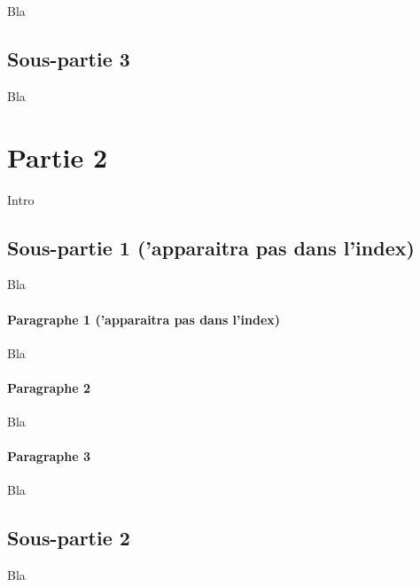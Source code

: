 Bla

\subsection{Sous-partie 3}

Bla

\section{Partie 2}

Intro

\subsection*{Sous-partie 1 ('apparaitra pas dans l'index)} Bla

\paragraph*{Paragraphe 1 ('apparaitra pas dans l'index)} Bla

\paragraph*{Paragraphe 2} Bla

\paragraph*{Paragraphe 3} Bla

\newpage

\subsection*{Sous-partie 2}

Bla

